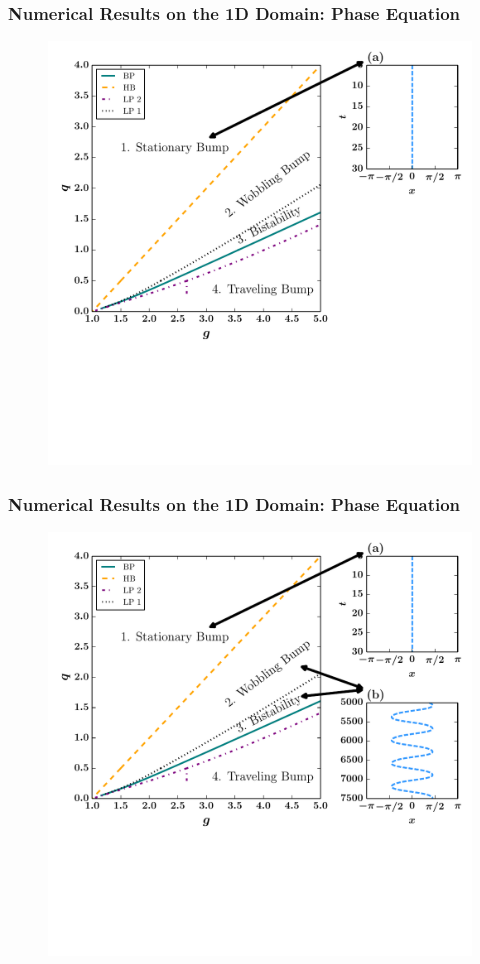 \documentclass{beamer}
\begin{document}
\begin{frame}
\frametitle{Numerical Results on the 1D Domain: Phase Equation}
\begin{figure}
 \includegraphics[width=.7\textwidth]{oned_phase_2par1.pdf}
\end{figure}
\end{frame}


\begin{frame}
\frametitle{Numerical Results on the 1D Domain: Phase Equation}
\begin{figure}
 \includegraphics[width=.7\textwidth]{oned_phase_2par2.pdf}
\end{figure}
\end{frame}
\end{document}
